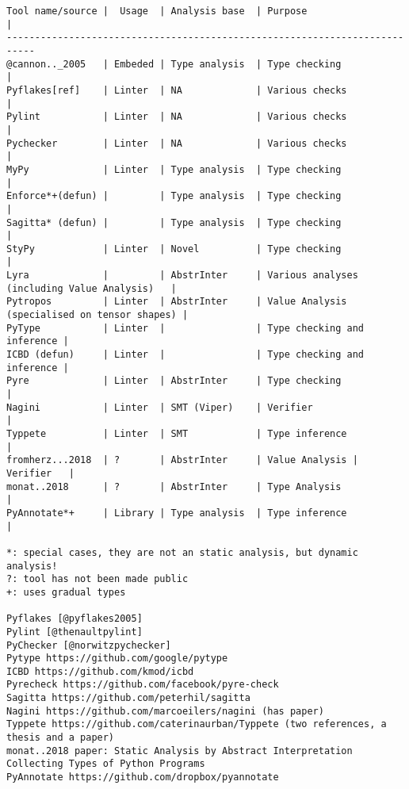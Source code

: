\begin{verbatim}
Tool name/source |  Usage  | Analysis base  | Purpose                     |
---------------------------------------------------------------------------
@cannon.._2005   | Embeded | Type analysis  | Type checking               |
Pyflakes[ref]    | Linter  | NA             | Various checks              |
Pylint           | Linter  | NA             | Various checks              |
Pychecker        | Linter  | NA             | Various checks              |
MyPy             | Linter  | Type analysis  | Type checking               |
Enforce*+(defun) |         | Type analysis  | Type checking               |
Sagitta* (defun) |         | Type analysis  | Type checking               |
StyPy            | Linter  | Novel          | Type checking               |
Lyra             |         | AbstrInter     | Various analyses (including Value Analysis)   |
Pytropos         | Linter  | AbstrInter     | Value Analysis (specialised on tensor shapes) |
PyType           | Linter  |                | Type checking and inference |
ICBD (defun)     | Linter  |                | Type checking and inference |
Pyre             | Linter  | AbstrInter     | Type checking               |
Nagini           | Linter  | SMT (Viper)    | Verifier                    |
Typpete          | Linter  | SMT            | Type inference              |
fromherz...2018  | ?       | AbstrInter     | Value Analysis | Verifier   |
monat..2018      | ?       | AbstrInter     | Type Analysis               |
PyAnnotate*+     | Library | Type analysis  | Type inference              |

*: special cases, they are not an static analysis, but dynamic analysis!
?: tool has not been made public
+: uses gradual types

Pyflakes [@pyflakes2005]
Pylint [@thenaultpylint]
PyChecker [@norwitzpychecker]
Pytype https://github.com/google/pytype
ICBD https://github.com/kmod/icbd
Pyrecheck https://github.com/facebook/pyre-check
Sagitta https://github.com/peterhil/sagitta
Nagini https://github.com/marcoeilers/nagini (has paper)
Typpete https://github.com/caterinaurban/Typpete (two references, a thesis and a paper)
monat..2018 paper: Static Analysis by Abstract Interpretation Collecting Types of Python Programs
PyAnnotate https://github.com/dropbox/pyannotate
\end{verbatim}

{}

{}

